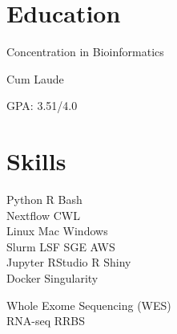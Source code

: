 
\begin{minipage}[t]{0.33\textwidth} %

\section{Education} 

\vspace{\topsep} %
\vspace{1pt}
\begin{tightitemize}
\item Concentration in Bioinformatics
\item Cum Laude
\item GPA: 3.51/4.0
\end{tightitemize}
\vspace{3pt}

\section{Skills}

Python \textbullet{} R \textbullet{} Bash \\ 
Nextflow \textbullet{} CWL \\
Linux \textbullet{} Mac \textbullet{} Windows\\
Slurm \textbullet{} LSF \textbullet{} SGE \textbullet{} AWS \\

Jupyter \textbullet{} RStudio \textbullet{} R Shiny\\
Docker \textbullet{} Singularity \\
\sectionspace %

Whole Exome Sequencing (WES) \\
RNA-seq \textbullet{} RRBS \\


\end{minipage}
